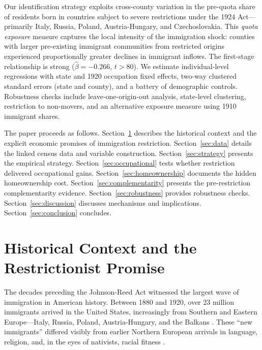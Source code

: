 \documentclass[12pt]{article}
\begin{document}
Our identification strategy exploits cross-county variation in the pre-quota share of residents born in countries subject to severe restrictions under the 1924 Act---primarily Italy, Russia, Poland, Austria-Hungary, and Czechoslovakia. This \textit{quota exposure} measure captures the local intensity of the immigration shock: counties with larger pre-existing immigrant communities from restricted origins experienced proportionally greater declines in immigrant inflows. The first-stage relationship is strong ($\hat{\beta} = -0.266$, $t > 80$). We estimate individual-level regressions with state and 1920 occupation fixed effects, two-way clustered standard errors (state and county), and a battery of demographic controls. Robustness checks include leave-one-origin-out analysis, state-level clustering, restriction to non-movers, and an alternative exposure measure using 1910 immigrant shares.

The paper proceeds as follows. Section~\ref{sec:history} describes the historical context and the explicit economic promises of immigration restriction. Section~\ref{sec:data} details the linked census data and variable construction. Section~\ref{sec:strategy} presents the empirical strategy. Section~\ref{sec:occupational} tests whether restriction delivered occupational gains. Section~\ref{sec:homeownership} documents the hidden homeownership cost. Section~\ref{sec:complementarity} presents the pre-restriction complementarity evidence. Section~\ref{sec:robustness} provides robustness checks. Section~\ref{sec:discussion} discusses mechanisms and implications. Section~\ref{sec:conclusion} concludes.



\section{Historical Context and the Restrictionist Promise}
\label{sec:history}

The decades preceding the Johnson-Reed Act witnessed the largest wave of immigration in American history. Between 1880 and 1920, over 23 million immigrants arrived in the United States, increasingly from Southern and Eastern Europe---Italy, Russia, Poland, Austria-Hungary, and the Balkans \citep{abramitzky2017}. These ``new immigrants'' differed visibly from earlier Northern European arrivals in language, religion, and, in the eyes of nativists, racial fitness \citep{higham1955, king2000}.
\end{document}
